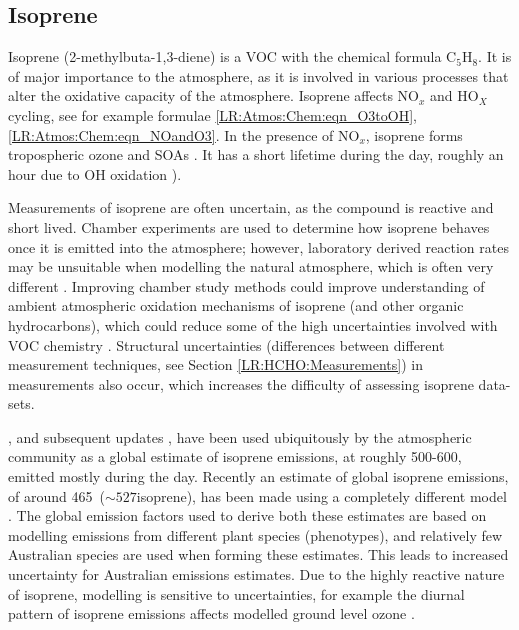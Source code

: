    
    
    
    
  \subsection{Isoprene}
  \label{LR:VOCs:Isop}
    Isoprene (2-methylbuta-1,3-diene) is a VOC with the chemical formula C$_5$H$_8$. 
    It is of major importance to the atmosphere, as it is involved in various processes that alter the oxidative capacity of the atmosphere.
    Isoprene affects NO$_x$ and HO$_X$ cycling, see for example formulae \ref{LR:Atmos:Chem:eqn_O3toOH}, \ref{LR:Atmos:Chem:eqn_NOandO3}.
    In the presence of NO$_x$, isoprene forms tropospheric ozone and SOAs \parencite{Wagner2002, Millet2006}.
    It has a short lifetime during the day, roughly an hour due to OH oxidation \parencite{AtkinsonArey2003}).
    
    Measurements of isoprene are often uncertain, as the compound is reactive and short lived.
    Chamber experiments are used to determine how isoprene behaves once it is emitted into the atmosphere; however, laboratory derived reaction rates may be unsuitable when modelling the natural atmosphere, which is often very different \parencite{Kanakidou2005,Nguyen2014}.
    Improving chamber study methods could improve understanding of ambient atmospheric oxidation mechanisms of isoprene (and other organic hydrocarbons), which could reduce some of the high uncertainties involved with VOC chemistry \parencite{Nguyen2014}.
    Structural uncertainties (differences between different measurement techniques, see Section \ref{LR:HCHO:Measurements}) in measurements also occur, which increases the difficulty of assessing isoprene data-sets.
    
    \textcite{Guenther1995}, and subsequent updates \parencite{Guenther2000,Guenther2006,Guenther2012}, have been used ubiquitously by the atmospheric community as a global estimate of isoprene emissions, at roughly 500-600\tgpyr, emitted mostly during the day.
    Recently an estimate of global isoprene emissions, of around 465\tgcpyr ~($\sim 527$\tgpyr isoprene), has been made using a completely different model \parencite{Messina2016}.
    The global emission factors used to derive both these estimates are based on modelling emissions from different plant species (phenotypes), and relatively few Australian species are used when forming these estimates.
    This leads to increased uncertainty for Australian emissions estimates.
    Due to the highly reactive nature of isoprene, modelling is sensitive to uncertainties, for example the diurnal pattern of isoprene emissions affects modelled ground level ozone \parencite{Hewitt2011, Fan2004}.
    
